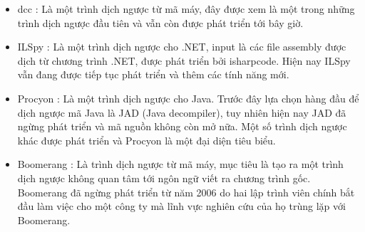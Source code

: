 \begin{itemize}
	\item dcc \cite{dcc}: Là một trình dịch ngược từ mã máy, đây được xem là một trong những trình dịch ngược đầu tiên và vẫn còn được phát triển tới bây giờ.
	\item ILSpy \cite{ilspy}: Là một trình dịch ngược cho .NET, input là các file assembly được dịch từ chương trình .NET, được phát triển bởi isharpcode. Hiện nay ILSpy vẫn đang được tiếp tục phát triển và thêm các tính năng mới.
	\item Procyon \cite{procyon}: Là một trình dịch ngược cho Java. Trước đây lựa chọn hàng đầu để dịch ngược mã Java là JAD (Java decompiler), tuy nhiên hiện nay JAD đã ngừng phát triển và mã nguồn không còn mở nữa. Một số trình dịch ngược khác được phát triển và Procyon là một đại diện tiêu biểu.
	\item Boomerang \cite{boomeranghomepage}: Là trình dịch ngược từ mã máy, mục tiêu là tạo ra một trình dịch ngược không quan tâm tới ngôn ngữ viết ra chương trình gốc. Boomerang đã ngừng phát triển từ năm 2006 do hai lập trình viên chính bắt đầu làm việc cho một công ty mà lĩnh vực nghiên cứu của họ trùng lặp với Boomerang.
\end{itemize}

